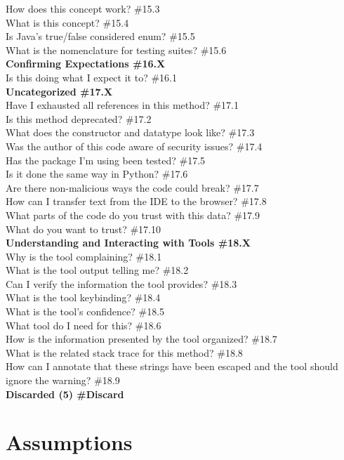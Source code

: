 \documentclass[10pt,journal,compsoc]{IEEEtran}
\begin{document}
	How does this concept work? \#15.3 \\
	What is this concept? \#15.4 \\
	Is Java's true/false considered enum? \#15.5 \\
	What is the nomenclature for testing suites? \#15.6 \\
\textbf{Confirming Expectations  \#16.X} \\
	Is this doing what I expect it to? \#16.1 \\
\textbf{Uncategorized  \#17.X} \\
	Have I exhausted all references in this method? \#17.1 \\
	Is this method deprecated? \#17.2 \\
	What does the constructor and datatype look like? \#17.3 \\
	Was the author of this code aware of security issues? \#17.4 \\
	Has the package I'm using been tested? \#17.5 \\
	Is it done the same way in Python? \#17.6 \\
	Are there non-malicious ways the code could break? \#17.7 \\
	How can I transfer text from the IDE to the browser? \#17.8 \\
	What parts of the code do you trust with this data? \#17.9 \\
	What do you want to trust? \#17.10 \\
\textbf{Understanding and Interacting with Tools \#18.X} \\
	Why is the tool complaining? \#18.1 \\
	What is the tool output telling me?  \#18.2 \\
	Can I verify the information the tool provides? \#18.3 \\
	What is the tool keybinding?  \#18.4 \\
	What is the tool's confidence? \#18.5 \\
	What tool do I need for this?  \#18.6 \\
	How is the information presented by the tool organized?  \#18.7 \\
	What is the related stack trace for this method? \#18.8 \\
	How can I annotate that these strings have been escaped and the tool should ignore the warning? \#18.9 \\
\textbf{Discarded (5) \#Discard}


\section*{Assumptions}
\end{document}
